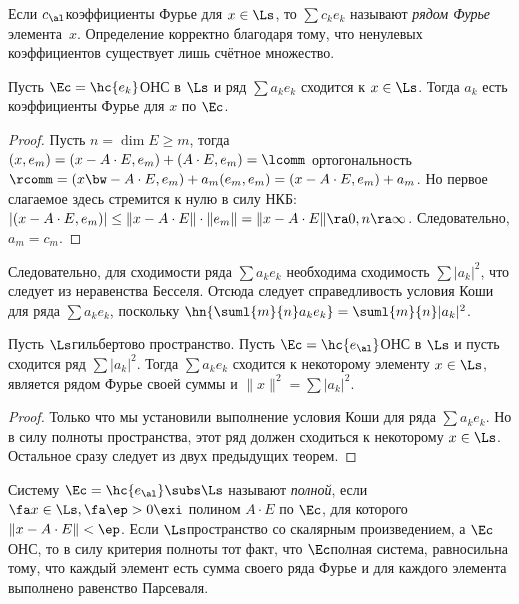 \documentclass[a4paper]{article}
\begin{document}
Если $c_\al$\т коэффициенты Фурье для $x \in \Ls$, то $\sum c_k e_k$ называют \emph{рядом Фурье}
элемента~$x$. Определение корректно благодаря тому, что ненулевых коэффициентов
существует лишь счётное множество.

\begin{theorem}
Пусть $\Ec = \hc{e_k}$\т ОНС в $\Ls$ и ряд $\sum a_k e_k$ сходится к $x \in \Ls$. Тогда
$a_k$ есть коэффициенты Фурье для $x$ по $\Ec$.
\end{theorem}
\begin{proof}
Пусть $n = \dim E \ge m$, тогда $(x, e_m) = (x-A\cdot E, e_m) + (A\cdot E, e_m) = \lcomm$
ортогональность $\rcomm = (x \bw- A\cdot E, e_m) + a_m(e_m,e_m) = (x - A \cdot E, e_m) + a_m$.
Но первое слагаемое здесь стремится к нулю в силу НКБ:
$|(x - A\cdot E, e_m)| \le \|x - A\cdot E\| \cdot \|e_m\| = \|x - A\cdot E\| \ra 0, n \ra \infty$.
Следовательно, $a_m = c_m$.
\end{proof}

Следовательно, для сходимости ряда $\sum a_k e_k$ необходима сходимость $\sum |a_k|^2$, что
следует из неравенства Бесселя. Отсюда следует справедливость условия Коши для ряда $\sum a_ke_k$,
поскольку $\hn{\suml{m}{n} a_k e_k} = \suml{m}{n} |a_k|^2$.

\begin{theorem}
Пусть $\Ls$\т гильбертово пространство. Пусть $\Ec = \hc{e_\al}$\т ОНС в $\Ls$ и пусть сходится ряд
$\sum |a_k|^2$. Тогда $\sum a_k e_k$ сходится к некоторому элементу $x \in \Ls$, является
рядом Фурье своей суммы и $\|x\|^2 = \sum |a_k|^2$.
\end{theorem}
\begin{proof}
Только что мы установили выполнение условия Коши для ряда $\sum a_k e_k$. Но в силу полноты
пространства, этот ряд должен сходиться к некоторому $x \in \Ls$.
Остальное сразу следует из двух предыдущих теорем.
\end{proof}

Систему $\Ec = \hc{e_\al} \subs \Ls$ называют \emph{полной}, если $\fa x \in \Ls, \fa \ep > 0 \exi$
полином $A \cdot E$ по $\Ec$, для
которого $\|x - A \cdot E \| < \ep$.
Если $\Ls$\т пространство со скалярным произведением, а $\Ec$\т ОНС, то в силу критерия полноты тот
факт, что $\Ec$\т полная система, равносильна тому, что каждый элемент есть сумма своего ряда
Фурье и для каждого элемента выполнено равенство Парсеваля.
\end{document}
